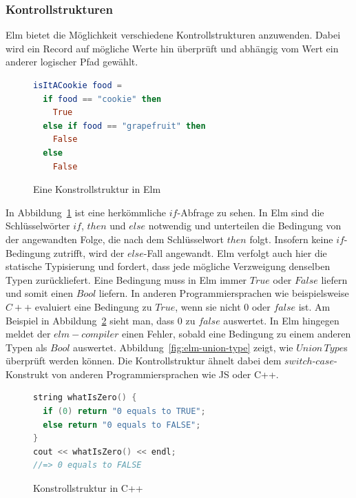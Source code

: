 \subsubsection{Kontrollstrukturen}
\label{sec:Kontrollstrukturen}
Elm bietet die Möglichkeit verschiedene Kontrollstrukturen anzuwenden. Dabei wird ein Record auf mögliche Werte hin überprüft und abhängig vom Wert ein anderer logischer Pfad gewählt.
\begin{figure}[h]
\begin{lstlisting}[language=Elm]
isItACookie food =
  if food == "cookie" then
  	True
  else if food == "grapefruit" then
    False
  else
    False
\end{lstlisting}
\caption{Eine Konstrollstruktur in Elm}\label{fig:elm-conditional}
\end{figure}
In Abbildung~\ref{fig:elm-conditional} ist eine herkömmliche $if$-Abfrage zu sehen. In Elm sind die Schlüsselwörter $if$, $then$ und $else$ notwendig und unterteilen die Bedingung von der angewandten Folge, die nach dem Schlüsselwort $then$ folgt. Insofern keine $if$-Bedingung zutrifft, wird der $else$-Fall angewandt.
Elm verfolgt auch hier die statische Typisierung und fordert, dass jede mögliche Verzweigung denselben Typen zurückliefert. Eine Bedingung muss in Elm immer $True$ oder $False$ liefern und somit einen $Bool$ liefern. In anderen Programmiersprachen wie beispielsweise $C++$ evaluiert eine Bedingung zu $True$, wenn sie nicht $0$ oder $false$ ist. Am Beispiel in Abbildung~\ref{fig:cpp-conditional} sieht man, dass $0$ zu $false$ auswertet. In Elm hingegen meldet der $elm-compiler$ einen Fehler, sobald eine Bedingung zu einem anderen Typen als $Bool$ auswertet.
Abbildung~\ref{fig:elm-union-type} zeigt, wie $Union\,Type$s überprüft werden können. Die Kontrollstruktur ähnelt dabei dem $switch$-$case$-Konstrukt von anderen Programmiersprachen wie \ac{JS} oder C++.
\begin{figure}[h]
\begin{lstlisting}[language=cpp]
string whatIsZero() {
  if (0) return "0 equals to TRUE";
  else return "0 equals to FALSE";
}
cout << whatIsZero() << endl;
//=> 0 equals to FALSE

\end{lstlisting}
\caption{Konstrollstruktur in C++}\label{fig:cpp-conditional}
\end{figure}

